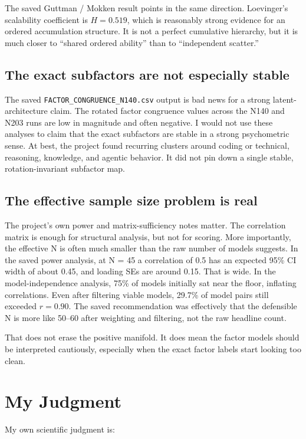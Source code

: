 \documentclass[11pt]{article}
\begin{document}
The saved Guttman / Mokken result points in the same direction. Loevinger's scalability coefficient is $H = 0.519$, which is reasonably strong evidence for an ordered accumulation structure. It is not a perfect cumulative hierarchy, but it is much closer to ``shared ordered ability'' than to ``independent scatter.''

\subsection{The exact subfactors are not especially stable}
The saved \texttt{FACTOR\_CONGRUENCE\_N140.csv} output is bad news for a strong latent-architecture claim. The rotated factor congruence values across the N140 and N203 runs are low in magnitude and often negative. I would not use these analyses to claim that the exact subfactors are stable in a strong psychometric sense. At best, the project found recurring clusters around coding or technical, reasoning, knowledge, and agentic behavior. It did not pin down a single stable, rotation-invariant subfactor map.

\subsection{The effective sample size problem is real}
The project's own power and matrix-sufficiency notes matter. The correlation matrix is enough for structural analysis, but not for scoring. More importantly, the effective N is often much smaller than the raw number of models suggests. In the saved power analysis, at N = 45 a correlation of 0.5 has an expected 95\% CI width of about 0.45, and loading SEs are around 0.15. That is wide. In the model-independence analysis, 75\% of models initially sat near the floor, inflating correlations. Even after filtering viable models, 29.7\% of model pairs still exceeded $r = 0.90$. The saved recommendation was effectively that the defensible N is more like 50--60 after weighting and filtering, not the raw headline count.

That does not erase the positive manifold. It does mean the factor models should be interpreted cautiously, especially when the exact factor labels start looking too clean.

\section{My Judgment}
My own scientific judgment is:
\end{document}
